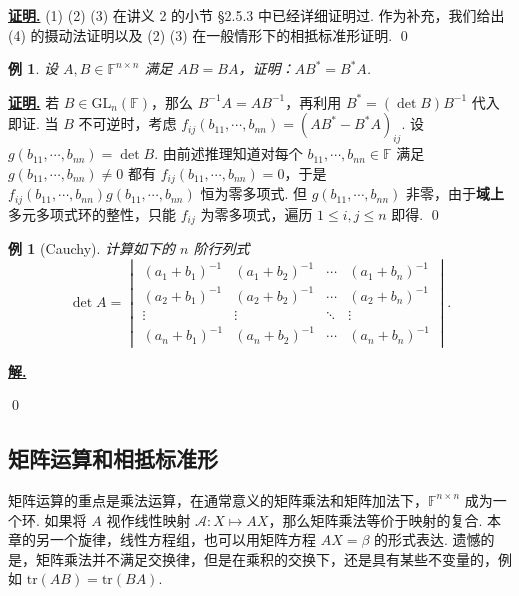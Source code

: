 \documentclass[10pt,openany]{article}
\theoremstyle{thmstyle} %
\theoremstyle{defstyle} %
\theoremstyle{prostyle} %
\theoremstyle{exastyle}
\newtheorem{example}[theorem]{例}
\theoremstyle{remstyle}
\renewenvironment{proof}[1][证明]{\par\underline{\textbf{#1.}} \;\fangsong}{\qed\par}
\newenvironment{solution}{\par\underline{\textbf{解.}} \;\fangsong}{\qed\par}
\newcommand{\F}{\mathbb{F}}
\newcommand{\gfn}{\text{GL}_n(\mathbb{F})}
\newcommand{\n}{^{n \times n}}
\newcommand{\tr}{\mathrm{tr}}
\begin{document}
\begin{proof}
	(1) (2) (3) 在讲义 2 的小节 \S 2.5.3 中已经详细证明过. 作为补充，我们给出 (4) 的摄动法证明以及 (2) (3) 在一般情形下的相抵标准形证明.
\end{proof}

\begin{example}
	设 \( A,B \in \F\n \) 满足 \( AB=BA \)，证明：\( AB^*=B^*A \).
\end{example}

\begin{proof}
	若 \( B \in \gfn \)，那么 \( B^{-1}A=AB^{-1} \)，再利用 \( B^*=(\det B) B^{-1} \) 代入即证. 当 \( B \) 不可逆时，考虑 \( f_{ij}(b_{11},\cdots,b_{nn})= (AB^*-B^*A)_{ij} \). 设 \( g(b_{11},\cdots,b_{nn})=\det B \). 由前述推理知道对每个 \( b_{11},\cdots,b_{nn} \in \F \) 满足 \( g(b_{11},\cdots,b_{nn}) \neq 0 \) 都有 \( f_{ij}(b_{11},\cdots,b_{nn})=0 \)，于是 \( f_{ij}(b_{11},\cdots,b_{nn})g(b_{11},\cdots,b_{nn}) \) 恒为零多项式. 但 \( g(b_{11},\cdots,b_{nn}) \) 非零，由于\textbf{域上}多元多项式环的整性，只能 \( f_{ij} \) 为零多项式，遍历 \( 1 \leq i,j \leq n \) 即得.
\end{proof}


\begin{example}[Cauchy]
	计算如下的 \( n \) 阶行列式
	\[ \det A= \begin{vmatrix}
		(a_1+b_1)^{-1} & (a_1+b_2)^{-1} & \cdots & (a_1+b_n)^{-1} \\
		(a_2+b_1)^{-1} & (a_2+b_2)^{-1} & \cdots & (a_2+b_n)^{-1} \\
		\vdots & \vdots & \ddots & \vdots \\
		(a_n+b_1)^{-1} & (a_n+b_2)^{-1} & \cdots & (a_n+b_n)^{-1} 
	\end{vmatrix}. \]
\end{example}

\begin{solution}
	
\end{solution}

\subsection{矩阵运算和相抵标准形}

矩阵运算的重点是乘法运算，在通常意义的矩阵乘法和矩阵加法下，\( \F\n \) 成为一个环. 如果将 \( A \) 视作线性映射 \( \mathscr{A}: X \mapsto AX \)，那么矩阵乘法等价于映射的复合. 本章的另一个旋律，线性方程组，也可以用矩阵方程 \( AX=\beta \) 的形式表达. 遗憾的是，矩阵乘法并不满足交换律，但是在乘积的交换下，还是具有某些不变量的，例如 \( \tr(AB)=\tr(BA) \).
\end{document}
